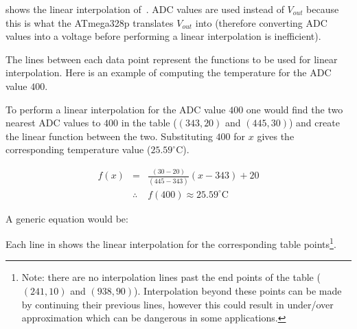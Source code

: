 \documentclass[main.tex]{subfiles}
\begin{document}
	 shows the linear interpolation of~.
	ADC values are used instead of $V_{out}$ because this is what the ATmega328p
	translates $V_{out}$ into (therefore converting ADC values into a voltage
	before performing a linear interpolation is inefficient).
	
	The lines between each data point represent
	the functions to be used for linear interpolation. Here is an example of
	computing the temperature for the ADC value $400$.
	
	To perform a linear interpolation for the ADC value $400$ one
	would find the two nearest ADC values to $400$ in the table ($(343,20)$ and
	$(445,30)$) and create the linear function between the two. Substituting $400$ for $x$
	gives the corresponding temperature value ($25.59^{\circ}\mathrm{C}$).
	
	\begin{eqnarray*}
		f(x) & = & \frac{(30-20)}{(445-343)}(x-343)+20 \\
		& \therefore & f(400) \approx 25.59^{\circ}\mathrm{C}
	\end{eqnarray*}
	
	A generic equation would be:
	

	Each line in  shows the linear
	interpolation for the corresponding table points\footnote{Note: there are no
		interpolation lines past the end points of the table ($(241,10)$ and
		$(938,90)$). Interpolation beyond these points can be made by continuing
		their previous lines, however this could result in under/over
		approximation which can be dangerous in some  applications.}.
	
	
	
\end{document}
